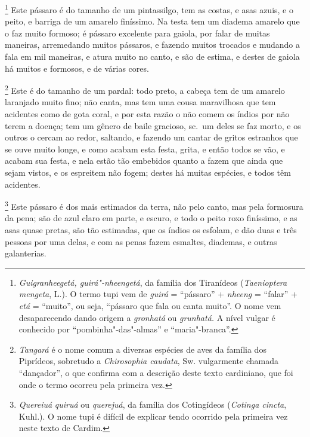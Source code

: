 \begin{linenumbers}
\footnote{ \textit{Guigranheegetá,
guirá"-nheengetá}, da família dos Tiranídeos (\textit{Taenioptera
mengeta}, L.). O termo tupi vem de \textit{guirá} = ``pássaro'' +
\textit{nheeng} = ``falar'' + \textit{etá} = ``muito'', ou seja, ``pássaro
que fala ou canta muito''. O nome vem desaparecendo dando origem a
\textit{gronhatá} ou \textit{grunhatá.} A nível vulgar é conhecido por
``pombinha"-das"-almas'' e ``maria"-branca''.} Este pássaro é
do tamanho de um pintassilgo, tem as costas, e asas azuis, e o peito, e
barriga de um amarelo finíssimo. Na testa tem um diadema amarelo que o
faz muito formoso; é pássaro excelente para gaiola, por falar de muitas
maneiras, arremedando muitos pássaros, e fazendo muitos trocados e
mudando a fala em mil maneiras, e atura muito no canto, e são de
estima, e destes de gaiola há muitos e formosos, e de várias cores. 

\footnote{ \textit{Tangará} é o nome comum a
diversas espécies de aves da família dos Piprídeos, sobretudo a
\textit{Chirosophia caudata}, Sw. vulgarmente chamada ``dançador'', o
que confirma com a descrição deste texto cardiniano, que foi onde o
termo ocorreu pela primeira vez.} Este é do tamanho de um
pardal: todo preto, a cabeça tem de um amarelo laranjado muito fino;
não canta, mas tem uma cousa maravilhosa que tem acidentes como de gota
coral, e por esta razão o não comem os índios por não terem a doença;
tem um gênero de baile gracioso, sc.~um deles se faz morto, e os
outros o cercam ao redor, saltando, e fazendo um cantar de gritos
estranhos que se ouve muito longe, e como acabam esta festa, grita, e
então todos se vão, e acabam sua festa, e nela estão tão embebidos
quanto a fazem que ainda que sejam vistos, e os espreitem não fogem;
destes há muitas espécies, e todos têm acidentes. 

\footnote{ \textit{Quereiuá} \textit{quiruá} ou
\textit{querejuá}, da família dos Cotingídeos (\textit{Cotinga
cincta}, Kuhl.). O nome tupi é difícil de explicar tendo ocorrido pela
primeira vez neste texto de Cardim.} Este
pássaro é dos mais estimados da terra, não pelo canto, mas pela
formosura da pena; são de azul claro em parte, e escuro, e todo o peito
roxo finíssimo, e as asas quase pretas, são tão estimadas, que os
índios os esfolam, e dão duas e três pessoas por uma delas, e com as
penas fazem esmaltes, diademas, e outras galanterias.

\enlargethispage{\baselineskip}


\end{linenumbers}
